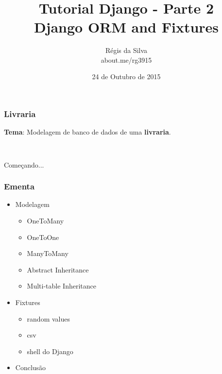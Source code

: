 \documentclass{beamer}
\title{Tutorial Django - Parte 2\\ Django ORM and Fixtures}
\author{R\'egis da Silva\\ {\texorpdfstring{\color{blue}}{ }about.me/rg3915}}
\institute{\url{github.com/grupy-sp/encontros}}
\date{24 de Outubro de 2015}
\begin{document}
\justifying %

{%




\begin{frame}
	\titlepage
\end{frame}

\begin{frame}[fragile]\frametitle{Livraria}
	
\textbf{Tema}: Modelagem de banco de dados de uma \textbf{livraria}.

\

Começando...


\end{frame}

\begin{frame}\frametitle{Ementa}

\begin{itemize}
	\item Modelagem
	\begin{itemize}
		\item OneToMany
		\item OneToOne
		\item ManyToMany
		\item Abstract Inheritance
		\item Multi-table Inheritance
	\end{itemize}
	\item Fixtures
	\begin{itemize}
		\item random values
		\item csv
		\item shell do Django
	\end{itemize}
	\item Conclusão
\end{itemize}
	

\end{frame}}
\end{document}
